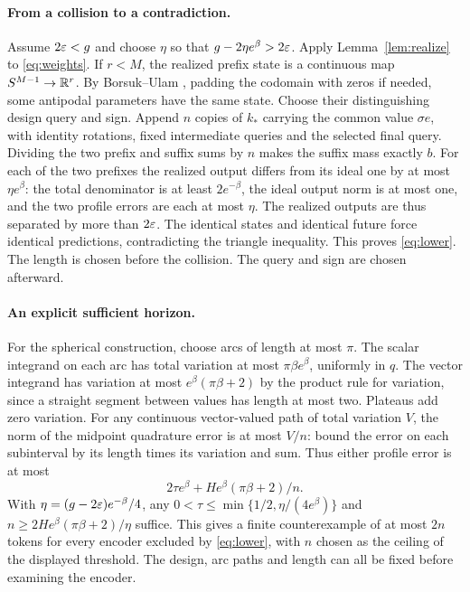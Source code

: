 \paragraph{From a collision to a contradiction.}
Assume $2\varepsilon<g$ and choose $\eta$ so that $g-2\eta e^\beta>2\varepsilon$. Apply Lemma~\ref{lem:realize} to \eqref{eq:weights}. If $r<M$, the realized prefix state is a continuous map $S^{M-1}\to\mathbb R^r$. By Borsuk--Ulam \cite{borsuk}, padding the codomain with zeros if needed, some antipodal parameters have the same state. Choose their distinguishing design query and sign. Append $n$ copies of $k_*$ carrying the common value $\sigma e$, with identity rotations, fixed intermediate queries and the selected final query. Dividing the two prefix and suffix sums by $n$ makes the suffix mass exactly $b$. For each of the two prefixes the realized output differs from its ideal one by at most $\eta e^\beta$: the total denominator is at least $2e^{-\beta}$, the ideal output norm is at most one, and the two profile errors are each at most $\eta$. The realized outputs are thus separated by more than $2\varepsilon$. The identical states and identical future force identical predictions, contradicting the triangle inequality. This proves \eqref{eq:lower}. The length is chosen before the collision. The query and sign are chosen afterward.

\paragraph{An explicit sufficient horizon.}
For the spherical construction, choose arcs of length at most $\pi$. The scalar integrand on each arc has total variation at most $\pi\beta e^\beta$, uniformly in $q$. The vector integrand has variation at most $e^\beta(\pi\beta+2)$ by the product rule for variation, since a straight segment between values has length at most two. Plateaus add zero variation. For any continuous vector-valued path of total variation $V$, the norm of the midpoint quadrature error is at most $V/n$: bound the error on each subinterval by its length times its variation and sum. Thus either profile error is at most
\[
 2\tau e^\beta+H e^\beta(\pi\beta+2)/n.
\]
With $\eta=(g-2\varepsilon)e^{-\beta}/4$, any $0<\tau\le\min\{1/2,\eta/(4e^\beta)\}$ and $n\ge 2H e^\beta(\pi\beta+2)/\eta$ suffice. This gives a finite counterexample of at most $2n$ tokens for every encoder excluded by \eqref{eq:lower}, with $n$ chosen as the ceiling of the displayed threshold. The design, arc paths and length can all be fixed before examining the encoder.

